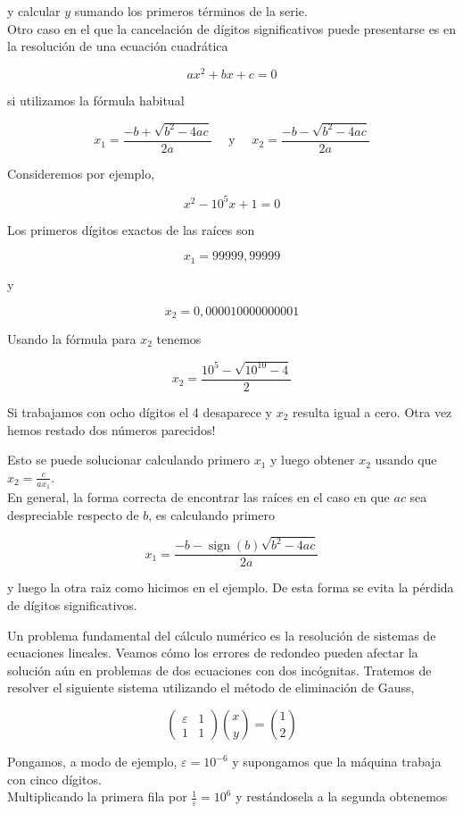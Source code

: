 \documentclass[10pt]{article}
\begin{document}
y calcular $y$ sumando los primeros términos de la serie.\\
Otro caso en el que la cancelación de dígitos significativos puede presentarse es en la resolución de una ecuación cuadrática

$$
a x^{2}+b x+c=0
$$

si utilizamos la fórmula habitual

$$
x_{1}=\frac{-b+\sqrt{b^{2}-4 a c}}{2 a} \quad \text { y } \quad x_{2}=\frac{-b-\sqrt{b^{2}-4 a c}}{2 a}
$$

Consideremos por ejemplo,

$$
x^{2}-10^{5} x+1=0
$$

Los primeros dígitos exactos de las raíces son

$$
x_{1}=99999,99999
$$

y

$$
x_{2}=0,000010000000001
$$

Usando la fórmula para $x_{2}$ tenemos

$$
x_{2}=\frac{10^{5}-\sqrt{10^{10}-4}}{2}
$$

Si trabajamos con ocho dígitos el 4 desaparece y $x_{2}$ resulta igual a cero. Otra vez hemos restado dos números parecidos!

Esto se puede solucionar calculando primero $x_{1}$ y luego obtener $x_{2}$ usando que $x_{2}=\frac{c}{a x_{1}}$.\\
En general, la forma correcta de encontrar las raíces en el caso en que $a c$ sea despreciable respecto de $b$, es calculando primero

$$
x_{1}=\frac{-b-\operatorname{sign}(b) \sqrt{b^{2}-4 a c}}{2 a}
$$

y luego la otra raiz como hicimos en el ejemplo. De esta forma se evita la pérdida de dígitos significativos.

Un problema fundamental del cálculo numérico es la resolución de sistemas de ecuaciones lineales. Veamos cómo los errores de redondeo pueden afectar la solución aún en problemas de dos ecuaciones con dos incógnitas. Tratemos de resolver el siguiente sistema utilizando el método de eliminación de Gauss,

$$
\left(\begin{array}{ll}
\varepsilon & 1 \\
1 & 1
\end{array}\right)\binom{x}{y}=\binom{1}{2}
$$

Pongamos, a modo de ejemplo, $\varepsilon=10^{-6}$ y supongamos que la máquina trabaja con cinco dígitos.\\
Multiplicando la primera fila por $\frac{1}{\varepsilon}=10^{6}$ y restándosela a la segunda obtenemos
\end{document}
